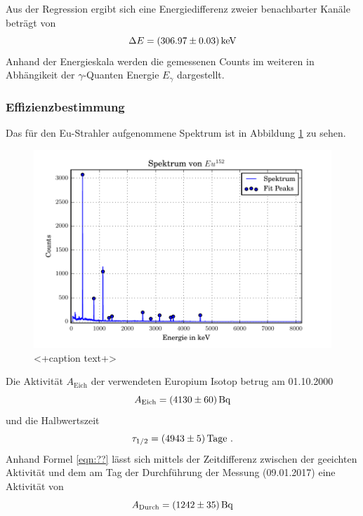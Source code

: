Aus der Regression ergibt sich eine Energiedifferenz zweier benachbarter Kanäle beträgt von 
\begin{equation}
  \Delta E = (\num{306.97 +- 0.03}) \, \text{keV}
  \label{eqn:Reg}
\end{equation}
Anhand der Energieskala werden die gemessenen Counts im weiteren in Abhängikeit der $\gamma$-Quanten Energie $E_{\gamma}$ dargestellt. 
\subsubsection{Effizienzbestimmung}
\label{sec:Q}
Das für den Eu-Strahler aufgenommene Spektrum ist in Abbildung \ref{fig:SpekCs} zu sehen. 
\begin{figure}[htpb]
  \centering
  \includegraphics[width=\textwidth]{./build/SpektEu.pdf}
  \caption{<+caption text+>}
  \label{fig:SpekCs}
\end{figure}
Die Aktivität $A_\text{Eich}$ der verwendeten Europium Isotop betrug am 01.10.2000
\begin{equation}
  A_\text{Eich} = (\num{4130 +- 60}) \, \text{Bq} 
  \label{eqn:AktEu}
\end{equation}
und die Halbwertszeit
\begin{equation}
  \tau_{1/2} = (\num{4943 +- 5}) \, \text{Tage} \ .
  \label{eqn:halb}
\end{equation}
Anhand Formel \ref{eqn:??} lässt sich mittels der Zeitdifferenz zwischen der geeichten Aktivität und dem am Tag der Durchführung der Messung (09.01.2017) eine Aktivität von 
\begin{equation}
  A_\text{Durch} = (\num{1242 +- 35}) \, \text{Bq}
  \label{eqn:AktEEu}
\end{equation}
